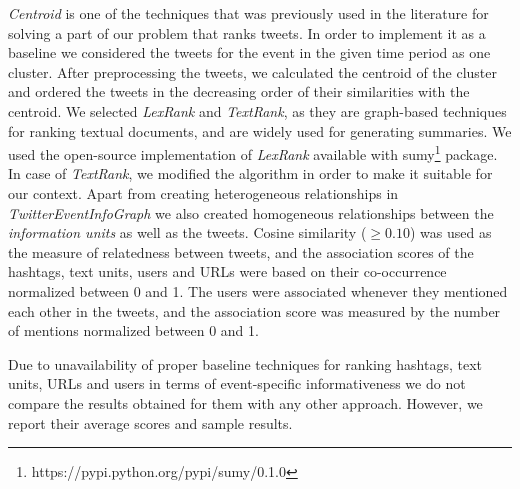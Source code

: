 \textit{Centroid} is one of the techniques that was previously used in the literature for solving a part of our problem that ranks tweets. In order to implement it as a baseline we considered the tweets for the event in the given time period as one cluster. After preprocessing the tweets, we calculated the centroid of the cluster and ordered the tweets in the decreasing order of their similarities with the centroid. We selected \textit{LexRank} and \textit{TextRank}, as they are graph-based techniques for ranking textual documents, and are widely used for generating summaries.  We used the open-source implementation of \textit{LexRank} available with sumy\footnote{\tiny https://pypi.python.org/pypi/sumy/0.1.0} package. In case of \textit{TextRank}, we modified the algorithm in order to make it suitable for our context. Apart from creating heterogeneous relationships in \textit{TwitterEventInfoGraph} we also created homogeneous relationships between the \textit{information units} as well as the tweets. Cosine similarity ($ \ge 0.10$) was used as the measure of relatedness between tweets, and the association scores of the hashtags, text units, users and URLs were based on their co-occurrence normalized between 0 and 1. The users were associated whenever they mentioned each other in the tweets, and the association score was measured by the number of mentions normalized between 0 and 1.

Due to unavailability of proper baseline techniques for ranking hashtags, text units, URLs and users in terms of event-specific informativeness we do not compare the results obtained for them with any other approach. However, we report their average scores and sample results.

